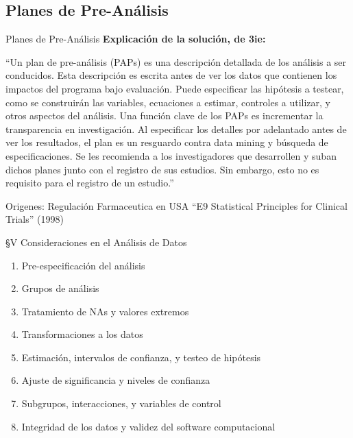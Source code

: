 \documentclass{beamer}
\begin{document}
\subsection*{Planes de Pre-Análisis}
\begin{frame}{Planes de Pre-Análisis}
\textbf{Explicación de la solución, de 3ie:}

``Un plan de pre-análisis (PAPs) es una descripción detallada de los análisis a ser conducidos. Esta descripción es escrita antes de ver los datos que contienen los impactos del programa bajo evaluación. Puede especificar las hipótesis a testear, como se construirán las variables, ecuaciones a estimar, controles a utilizar, y otros aspectos del análisis. Una función clave de los PAPs es incrementar la transparencia en investigación. Al especificar los detalles por adelantado antes de ver los resultados, el plan es un resguardo contra data mining y búsqueda de especificaciones. Se les recomienda a los investigadores que desarrollen y suban dichos planes junto con el registro de sus estudios. Sin embargo, esto no es requisito para el registro de un estudio.''
\end{frame}

\begin{frame}{Origenes: Regulación Farmaceutica en USA}
``E9 Statistical Principles for Clinical Trials'' (1998)
\href{http://www.fda.gov/downloads/drugs/guidancecomplianceregulatoryinformation/guidances/ucm073137.pdf}{}

\S V Consideraciones en el Análisis de Datos
\begin{enumerate}[<.->]
\item Pre-especificación del análisis
\item Grupos de análisis
\item Tratamiento de NAs y valores extremos
\item Transformaciones a los datos
\item Estimación, intervalos de confianza, y testeo de hipótesis
\item Ajuste de significancia y niveles de confianza
\item Subgrupos, interacciones, y variables de control
\item Integridad de los datos y validez del software computacional
\end{enumerate}
\end{frame}
\end{document}
